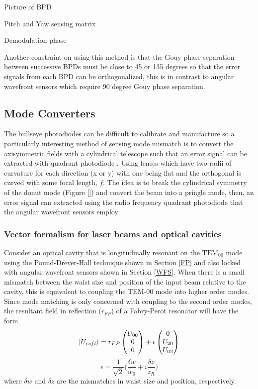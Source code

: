 		Picture of BPD
		
		Pitch and Yaw sensing matrix
		
		Demodulation phase

		
		Another constraint on using this method is that the Gouy phase separation between successive BPDs must be close to 45 or 135 degrees so that the error signals from each BPD can be orthogonalized, this is in contrast to angular wavefront sensors which require 90 degree Gouy phase separation.

		
\subsection{Mode Converters}
The bullseye photodiodes can be difficult to calibrate and manufacture so a particularly interesting method of sensing mode mismatch is to convert the axisymmetric fields with a cylindrical telescope such that an error signal can be extracted with quadrant photodiode .  Using lenses which have two radii of curvature for each direction (x or y) with one being flat and the orthogonal is curved with some focal length, $f$.  The idea is to break the cylindrical symmetry of the donut mode (Figure []) and convert the beam into a pringle mode, then, an error signal can extracted using the radio frequency quadrant photodiode that the angular wavefront sensors employ

\subsubsection{Vector formalism for laser beams and optical cavities}
Consider an optical cavity that is longitudinally resonant on the $\text{TEM}_{00}$ mode using the Pound-Drever-Hall technique shown in Section \ref{FP} and also locked with angular wavefront sensors shown in Section \ref{WFS}. When there is a small mismatch between the waist size and position of the input beam relative to the cavity, this is equivalent to coupling the TEM-00 mode into higher order modes.  Since mode matching is only concerned with coupling to the second order modes, the  resultant field in reflection ($r_{FP}$) of a Fabry-Perot resonator will have the form
	\begin{equation}\label{MMVector}
\ket{U_{refl}} = r_{FP} \begin{pmatrix} U_{00}
\\ 0
\\ 0
\end{pmatrix}
+
\epsilon \begin{pmatrix} 0
\\ U_{20}
\\ U_{02}
\end{pmatrix}
\end{equation}
\begin{equation}
\epsilon = \frac{1}{\sqrt{2}} \bigg(\frac{\delta w}{w_0} + i \frac{\delta z}{z_R}\bigg)
\end{equation}
where $\delta w$ and $\delta z$ are the mismatches in waist size and position, respectively.  

